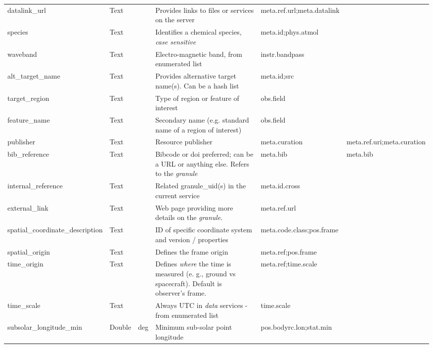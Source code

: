\documentclass[11pt,a4paper]{ivoa}
\begin{document}
\begin{landscape}
\begin{longtable}{p{3.5cm}p{0.5cm}p{1.4cm}p{1cm}p{7cm}p{5cm}}
datalink\_url&Text&&Provides links to files or services on the server&meta.ref.url;meta.datalink&\\

species&Text&&Identifies a chemical species, \emph{case sensitive}&meta.id;phys.atmol&\\

waveband&Text&&Electro-magnetic band, from enumerated list&instr.bandpass&\\

alt\_target\_name&Text&&Provides alternative target name(s). Can be a hash list&meta.id;src&\\

target\_region&Text&&Type of region or feature of interest&obs.field&\\

feature\_name&Text&&Secondary name (e.g. standard name of a region of interest)&obs.field &\\

publisher&Text&&Resource publisher&meta.curation&meta.ref.uri;meta.curation\\

bib\_reference&Text&&Bibcode or doi preferred; can be a URL or anything else. Refers to the \emph{granule}&meta.bib&meta.bib\\

internal\_reference&Text&&Related granule\_uid(s) in the current service&meta.id.cross&\\

external\_link&Text&&Web page providing more details on the \emph{granule}.&meta.ref.url&\\

spatial\_coordinate\_description&Text&&ID of specific coordinate system and version / properties&meta.code.class;pos.frame&\\

spatial\_origin&Text&&Defines the frame origin&meta.ref;pos.frame&\\

time\_origin&Text&&Defines \emph{where} the time is measured (e. g., ground vs spacecraft). Default is observer's frame.&meta.ref;time.scale&\\

time\_scale&Text&&Always UTC in \emph{data} services - from enumerated list&time.scale&\\

subsolar\_longitude\_min&Double&deg&Minimum sub-solar point longitude&pos.bodyrc.lon;stat.min&\\


\end{longtable}
\end{landscape}
\end{document}
